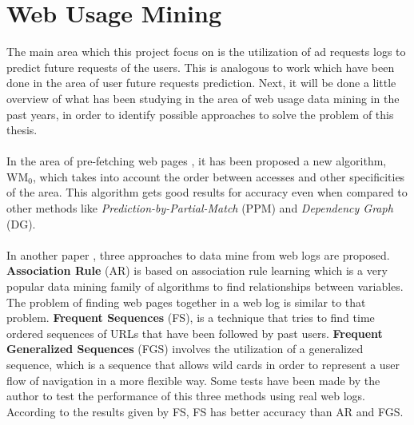 \section{Web Usage Mining}\label{sec:network}

\nocite{UjwalaPatil}

The main area which this project focus on is the utilization of ad requests logs
to predict future requests of the users. This is analogous to work which have
been done in the area of user future requests prediction. Next, it will be done
a little overview of what has been studying in the area of web usage data mining
in the past years, in order to identify possible approaches to solve the problem
of this thesis.

\paragraph{}

In the area of pre-fetching web pages \cite{Nanopoulos01effectiveprediction}, it
has been proposed a new algorithm, WM\begin{math}_0\end{math}, which takes into
  account the order between accesses and other specificities of the area. This
  algorithm gets good results for accuracy even when compared to other methods
  like \emph{Prediction-by-Partial-Match} (PPM) and \emph{Dependency Graph}
  (DG).

\paragraph{}

In another paper \cite{Gery:2003:EWU:956699.956716}, three approaches to data
mine from web logs are proposed. \textbf{Association Rule} (AR) is based on
association rule learning which is a very popular data mining family of
algorithms to find relationships between variables. The problem of finding web
pages together in a web log is similar to that problem. \textbf{Frequent
Sequences} (FS), is a technique that tries to find time ordered sequences of
URLs that have been followed by past users. \textbf{Frequent Generalized
Sequences} (FGS) involves the utilization of a generalized sequence, which is a
sequence that allows wild cards in order to represent a user flow of navigation
in a more flexible way. Some tests have been made by the author
\cite{Gery:2003:EWU:956699.956716} to test the performance of this three methods
using real web logs. According to the results given by FS, FS has better
accuracy than AR and FGS.

